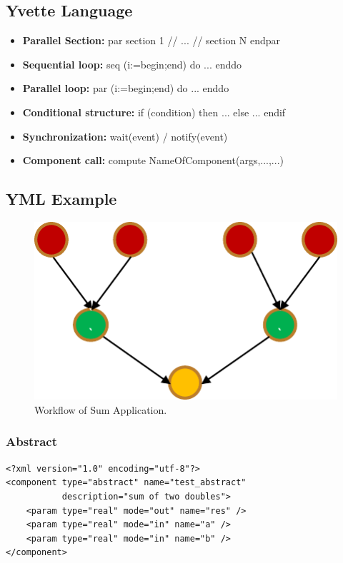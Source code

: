 \subsection{Yvette Language}

\begin{itemize}
	\item \textbf{Parallel Section:} par section 1 // ... // section N endpar
	\item \textbf{Sequential loop:} seq (i:=begin;end) do ... enddo
	\item \textbf{Parallel loop:}  par (i:=begin;end) do ... enddo
	\item \textbf{Conditional structure:} if (condition) then ... else ... endif
	\item \textbf{Synchronization:} wait(event) / notify(event)
	\item \textbf{Component call:} compute NameOfComponent(args,...,...)
\end{itemize}

\subsection{YML Example}

\begin{figure}[htbp]
	\centering
	\includegraphics[width=3.in]{fig/sum_workflow.pdf}
	\caption{Workflow of Sum Application.}
	\label{fig:sum_workflow}
\end{figure}

\subsubsection{Abstract}

\lstset{language=XML}
\begin{lstlisting}[frame=single]
<?xml version="1.0" encoding="utf-8"?>
<component type="abstract" name="test_abstract"
           description="sum of two doubles">
    <param type="real" mode="out" name="res" />
    <param type="real" mode="in" name="a" />
    <param type="real" mode="in" name="b" />
</component>
\end{lstlisting}


